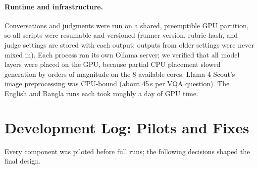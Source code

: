 \documentclass[11pt]{article}
\begin{document}
\paragraph{Runtime and infrastructure.} Conversations and judgments were run on a shared, preemptible GPU partition, so all scripts were resumable and versioned (runner version, rubric hash, and judge settings are stored with each output; outputs from older settings were never mixed in). Each process ran its own Ollama server; we verified that all model layers were placed on the GPU, because partial CPU placement slowed generation by orders of magnitude on the 8 available cores. Llama 4 Scout's image preprocessing was CPU-bound (about 45\,s per VQA question). The English and Bangla runs each took roughly a day of GPU time.

\section{Development Log: Pilots and Fixes}\label{app:dev}
Every component was piloted before full runs; the following decisions shaped the final design.
\end{document}
